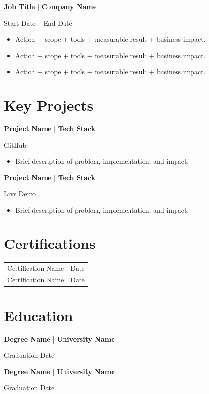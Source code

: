 \documentclass[letterpaper,10pt]{article}
\newcommand{\jobheading}[3]{
  \noindent
  \begin{minipage}[t]{0.75\linewidth}
    \textbf{\color{accent} #1} {\small\color{mutedtext}|} \textbf{#2}
  \end{minipage}%
  \hfill
  \begin{minipage}[t]{0.22\linewidth}
    \raggedleft\small #3
  \end{minipage}
  \vspace{-10pt}
}
\begin{document}
\jobheading{Job Title}{Company Name}{Start Date -- End Date}
\begin{itemize}
  \item Action + scope + tools + measurable result + business impact.
  \item Action + scope + tools + measurable result + business impact.
  \item Action + scope + tools + measurable result + business impact.
\end{itemize}

\section{Key Projects}

\jobheading{Project Name}{Tech Stack}{\href{https://github.com/yourproject}{GitHub}}
\begin{itemize}
  \item Brief description of problem, implementation, and impact.
\end{itemize}

\jobheading{Project Name}{Tech Stack}{\href{https://yourdemo.com}{Live Demo}}
\begin{itemize}
  \item Brief description of problem, implementation, and impact.
\end{itemize}

\section{Certifications}
\begin{tabularx}{\linewidth}{@{}X r@{}}
Certification Name & Date \\
Certification Name & Date \\
\end{tabularx}

\section{Education}
\jobheading{Degree Name}{University Name}{Graduation Date}
\jobheading{Degree Name}{University Name}{Graduation Date}
\end{document}
